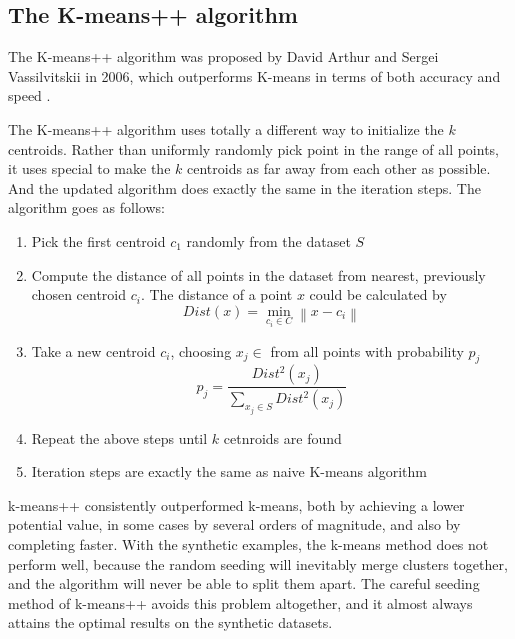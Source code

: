 \documentclass[11pt]{article}
\begin{document}
\subsection{The K-means++ algorithm}
The K-means++ algorithm was proposed by David Arthur and Sergei Vassilvitskii in 2006, which outperforms K-means in terms of both accuracy and speed \cite{kmeanspp}.
\par The K-means++ algorithm uses totally a different way to initialize the $k$ centroids. Rather than uniformly randomly pick point in the range of all points, it uses special to make the $k$ centroids as far away from each other as possible.
And the updated algorithm does exactly the same in the iteration steps. The algorithm goes as follows:
\begin{enumerate}
  \item Pick the first centroid $c_1$ randomly from the dataset $S$
  \item Compute the distance of all points in the dataset from nearest, previously chosen centroid $c_i$. The distance of a point $x$ could be calculated by $$ Dist(x) =\min_{c_i \in C} {\left\lVert x-c_i\right\rVert } $$
  \item Take a new centroid $c_i$, choosing $x_j \in $ from all points with probability $p_j$ $$p_j = \frac{Dist^2(x_j)}{\sum_{x_j \in S} Dist^2(x_j)} $$
  \item Repeat the above steps until $k$ cetnroids are found
  \item Iteration steps are exactly the same as naive K-means algorithm
\end{enumerate}
\par k-means++ consistently outperformed k-means, both by achieving a lower potential value,
in some cases by several orders of magnitude, and also by completing faster. With the synthetic
examples, the k-means method does not perform well, because the random seeding will inevitably
merge clusters together, and the algorithm will never be able to split them apart. The careful
seeding method of k-means++ avoids this problem altogether, and it almost always attains the
optimal results on the synthetic datasets.\cite{kmeanspp}
\end{document}
